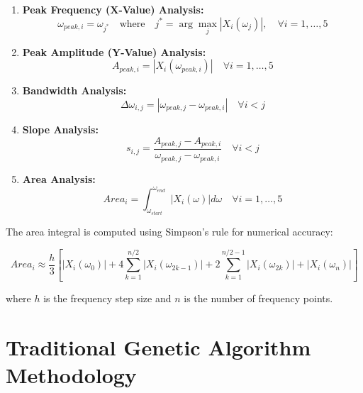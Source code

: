 \documentclass[12pt,a4paper]{article}
\begin{document}
\begin{enumerate}
    \item \textbf{Peak Frequency (X-Value) Analysis:}
    \begin{equation}\label{Eq.peak_frequency_analysis_detailed}
    \omega_{peak,i} = \omega_{j^*} \quad \text{where} \quad j^* = \arg\max_{j} |X_i(\omega_j)|, \quad \forall i = 1,\ldots,5
    \end{equation}

    \item \textbf{Peak Amplitude (Y-Value) Analysis:}
    \begin{equation}\label{Eq.peak_amplitude_analysis_detailed}
    A_{peak,i} = |X_i(\omega_{peak,i})| \quad \forall i = 1,\ldots,5
    \end{equation}

    \item \textbf{Bandwidth Analysis:}
    \begin{equation}\label{Eq.bandwidth_analysis_detailed}
    \Delta\omega_{i,j} = |\omega_{peak,j} - \omega_{peak,i}| \quad \forall i < j
    \end{equation}

    \item \textbf{Slope Analysis:}
    \begin{equation}\label{Eq.slope_analysis_detailed}
    s_{i,j} = \frac{A_{peak,j} - A_{peak,i}}{\omega_{peak,j} - \omega_{peak,i}} \quad \forall i < j
    \end{equation}

    \item \textbf{Area Analysis:}
    \begin{equation}\label{Eq.area_analysis_detailed}
    Area_i = \int_{\omega_{start}}^{\omega_{end}} |X_i(\omega)| d\omega \quad \forall i = 1,\ldots,5
\end{equation}
\end{enumerate}

The area integral is computed using Simpson's rule for numerical accuracy:

\begin{equation}\label{Eq.area_simpson_detailed}
Area_i \approx \frac{h}{3} \left[|X_i(\omega_0)| + 4\sum_{k=1}^{n/2} |X_i(\omega_{2k-1})| + 2\sum_{k=1}^{n/2-1} |X_i(\omega_{2k})| + |X_i(\omega_n)| \right]
\end{equation}

where $h$ is the frequency step size and $n$ is the number of frequency points.


\section{Traditional Genetic Algorithm Methodology}
\end{document}
